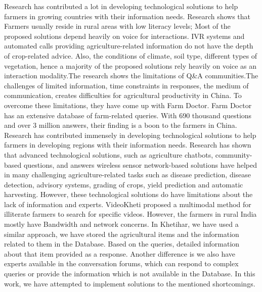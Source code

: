 \documentclass[10pt,conference]{IEEEtran}
\begin{document}
{Research \cite{castro2017serverless} has contributed a lot in developing technological solutions to help farmers in growing countries with their information needs. Research shows that Farmers usually reside in rural areas with low literacy levels; Most of the proposed solutions depend heavily on voice for interactions. IVR systems and automated calls providing agriculture-related information do not have the depth of crop-related advice. Also, the conditions of climate, soil type, different types of vegetation, hence a majority of the proposed solutions rely heavily on voice as an interaction modality.The research \cite{jain2018farmchat} shows the limitations of Q\&A communities.The challenges of limited information, time constraints in responses, the medium of communication, creates difficulties for agricultural productivity in China. To overcome these limitations, they have come up with Farm Doctor. Farm Doctor has an extensive database of farm-related queries. With 690 thousand questions and over 3 million answers, their finding is a boon to the farmers in China. Research has contributed immensely in developing technological solutions to help farmers in developing regions with their information needs.
\newline
\newline
Research \cite{salvi2019jamura} has shown that advanced technological solutions, such as agriculture chatbots, community-based questions, and answers wireless sensor network-based solutions have helped in many challenging agriculture-related tasks such as disease prediction, disease detection, advisory systems, grading of crops, \cite{sabharwal2020introduction} yield prediction and automatic harvesting. However, these technological solutions do have limitations about the lack of information and experts. VideoKheti proposed a multimodal method for illiterate farmers to search for specific videos. However, the farmers in rural India mostly have Bandwidth and network concerns. In Khetihar, we have used a similar approach, we have stored the agricultural items and the information related to them in the Database. Based on the queries, detailed information about that item provided as a response. Another difference is we also have experts available in the conversation forums, which can respond to complex queries or provide the  information which is not available in the Database. In this work, we have attempted to implement solutions to the mentioned shortcomings.
\newline
\newline
}
\end{document}
